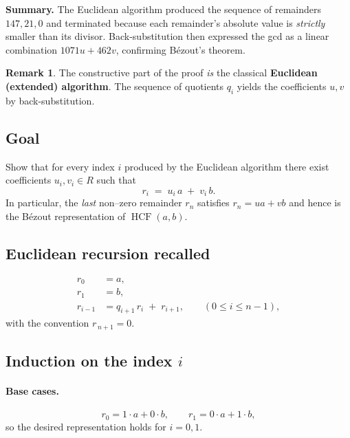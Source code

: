 \documentclass[12pt]{article}
\theoremstyle{definition} %
\newtheorem{remark}{Remark}
\theoremstyle{plain} %
\begin{document}
  \bigskip
  \textbf{Summary.}\;
  The Euclidean algorithm produced the sequence of remainders
  \(147,21,0\) and terminated because each remainder’s absolute value
  is \emph{strictly} smaller than its divisor.  
  Back-substitution then expressed the gcd as a linear
  combination \(1071u+462v\), confirming Bézout’s theorem.
  \begin{remark}
  The constructive part of the proof \emph{is} the classical
  \textbf{Euclidean (extended) algorithm}.  
  The sequence of quotients \(q_{i}\) yields the coefficients
  \(u,v\) by back-substitution.
  \end{remark}
\subsection*{Goal}
Show that for every index \(i\) produced by the Euclidean algorithm  
there exist coefficients \(u_i,v_i\in R\) such that
\[
      r_i \;=\; u_i\,a \;+\; v_i\,b .
\]
In particular, the \emph{last} non–zero remainder \(r_n\) satisfies  
\(r_n = ua+vb\) and hence is the Bézout representation of
\(\operatorname{HCF}(a,b)\).

\bigskip
\subsection*{Euclidean recursion recalled}
\[
\begin{aligned}
   r_0 &= a,\\[2pt]
   r_1 &= b,\\[4pt]
   r_{i-1} &= q_{i+1}\,r_{i} \;+\; r_{i+1}, 
   \qquad (0\le i\le n-1),
\end{aligned}\tag{$\star$}
\]
with the convention \(r_{\,n+1}=0\).

\bigskip
\subsection*{Induction on the index \(i\)}

\paragraph{Base cases.}
\[
    r_0 = 1\cdot a + 0\cdot b,
    \qquad
    r_1 = 0\cdot a + 1\cdot b ,
\]
so the desired representation holds for \(i=0,1\).
\end{document}
